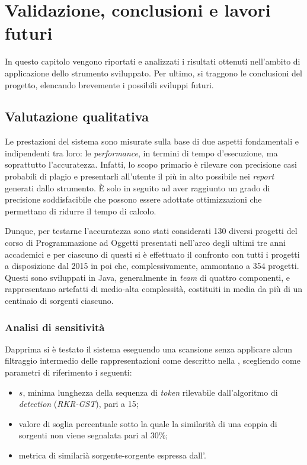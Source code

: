 \chapter{Validazione, conclusioni e lavori futuri}
\label{chapter:validation}
In questo capitolo vengono riportati e analizzati i risultati ottenuti nell'ambito di applicazione dello strumento sviluppato.
%
Per ultimo, si traggono le conclusioni del progetto, elencando brevemente i possibili sviluppi futuri.

\section{Valutazione qualitativa}
Le prestazioni del sistema sono misurate sulla base di due aspetti fondamentali e indipendenti tra loro: le \textit{performance}, in termini di tempo d'esecuzione, ma soprattutto l'accuratezza.
%
Infatti, lo scopo primario è rilevare con precisione casi probabili di plagio e presentarli all'utente il più in alto possibile nei \textit{report} generati dallo strumento.
%
\`E solo in seguito ad aver raggiunto un grado di precisione soddisfacibile che possono essere adottate ottimizzazioni che permettano di ridurre il tempo di calcolo.

Dunque, per testarne l'accuratezza sono stati considerati 130 diversi progetti del corso di Programmazione ad Oggetti presentati nell'arco degli ultimi tre anni accademici e per ciascuno di questi si è effettuato il confronto con tutti i progetti a disposizione dal 2015 in poi che, complessivamente, ammontano a 354 progetti.
%
Questi sono sviluppati in Java, generalmente in \textit{team} di quattro componenti, e rappresentano artefatti di medio-alta complessità, costituiti in media da più di un centinaio di sorgenti ciascuno.

\subsection{Analisi di sensitività}
Dapprima si è testato il sistema eseguendo una scansione senza applicare alcun filtraggio intermedio delle rappresentazioni come descritto nella , scegliendo come parametri di riferimento i seguenti:
\begin{itemize}
    \item $s$, minima lunghezza della sequenza di \textit{token} rilevabile dall'algoritmo di \textit{detection} (\textit{RKR-GST}), pari a 15;
    \item valore di soglia percentuale sotto la quale la similarità di una coppia di sorgenti non viene segnalata pari al 30\%;
    \item metrica di similarià sorgente-sorgente espressa dall'.
\end{itemize}


